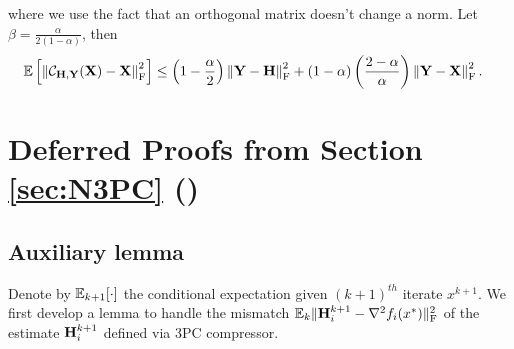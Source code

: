 \documentclass[11pt]{article}
\begin{document}
	where we use the fact that an orthogonal matrix doesn't change a norm. Let $\beta=\frac{\alpha}{2(1-\alpha)}$, then
	\begin{align}
		\mathbb{E}\left[\left\|{\mathcal{C}}_{\mathbf{H},\mathbf{Y}}(\mathbf{X}) - \mathbf{X}\right\|^2_{\rm F}\right] &\leq \left(1-\frac{\alpha}{2}\right)\left\|\mathbf{Y}-\mathbf{H}\right\|^2_{\rm F} + (1-\alpha)\left(\frac{2-\alpha}{\alpha}\right)\left\|\mathbf{Y}-\mathbf{X}\right\|^2_{\rm F}.
	\end{align}
	
	
	
	
	
	\section{Deferred Proofs from Section \ref{sec:N3PC} ()}
	
	\subsection{Auxiliary lemma}
	
	Denote by $\mathbb{E}_{k+1}[\cdot]$ the conditional expectation given $(k+1)^{th}$ iterate $x^{k+1}$. We first develop a lemma to handle the mismatch $\mathbb{E}_k \|\mathbf{H}_i^{k+1} - \nabla^2 f_i(x^{*})\|^2_{\rm F}$ of the estimate $\mathbf{H}_i^{k+1}$ defined via 3PC compressor.
	
\end{document}
